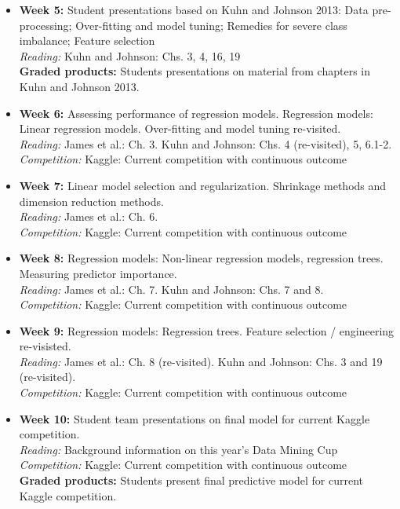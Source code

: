 \documentclass[11pt,oneside]{amsart}
\begin{document}
\begin{itemize}
\item \textbf{Week 5:} Student presentations based on Kuhn and Johnson
  2013: Data pre-processing; Over-fitting and model tuning; Remedies
  for severe class imbalance; Feature selection\\
\emph{Reading:} Kuhn and Johnson: Chs. 3, 4, 16, 19\\
\textbf{Graded products:} Students presentations on material from chapters in Kuhn and
Johnson 2013.\\

\item \textbf{Week 6:} Assessing performance of regression
  models. Regression models: Linear regression models. Over-fitting
  and model tuning re-visited.\\
\emph{Reading:} James et al.: Ch. 3. Kuhn and Johnson: Chs. 4
(re-visited), 5, 6.1-2.\\
\emph{Competition:} Kaggle: Current competition with continuous
outcome

\item \textbf{Week 7:} Linear model selection and
  regularization. Shrinkage methods and dimension reduction methods.\\
\emph{Reading:} James et al.: Ch. 6.\\
\emph{Competition:} Kaggle: Current competition with continuous
outcome

\item \textbf{Week 8:} Regression models: Non-linear regression
  models, regression trees. Measuring predictor importance.\\
\emph{Reading:} James et al.: Ch. 7. Kuhn and Johnson: Chs. 7 and 8.\\
\emph{Competition:} Kaggle: Current competition with continuous
outcome

\item \textbf{Week 9:} Regression models: Regression trees. Feature selection /
  engineering re-visisted.\\
\emph{Reading:} James et al.: Ch. 8 (re-visited). Kuhn and Johnson:
Chs. 3 and 19 (re-visited).\\
\emph{Competition:} Kaggle: Current competition with continuous
outcome

\item \textbf{Week 10:} Student team presentations on final model for current Kaggle
  competition.\\
\emph{Reading:} Background information on this year's Data Mining Cup\\
\emph{Competition:} Kaggle: Current competition with continuous
outcome\\
\textbf{Graded products:} Students present final predictive model for
current Kaggle competition.\\


\end{itemize}
\end{document}
